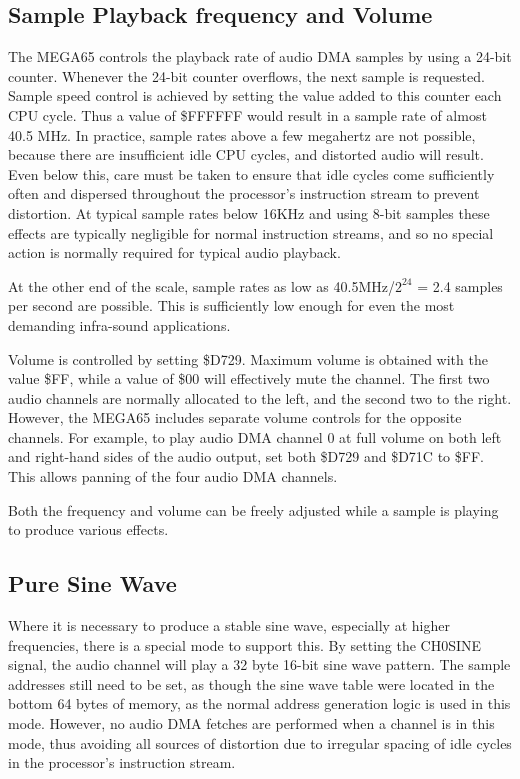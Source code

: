 \subsection{Sample Playback frequency and Volume}

The MEGA65 controls the playback rate of audio DMA samples by using a
24-bit counter.  Whenever the 24-bit counter overflows, the next
sample is requested. Sample speed control is achieved by setting the
value added to this counter each CPU cycle.  Thus a value of
\$FFFFFF would result in a sample rate of almost 40.5 MHz.  In
practice, sample rates above a few megahertz are not possible, because
there are insufficient idle CPU cycles, and distorted audio will
result.  Even below this, care must be taken to ensure that idle
cycles come sufficiently often and dispersed throughout the
processor's instruction stream to prevent distortion.  At typical
sample rates below 16KHz and using 8-bit samples these effects are
typically negligible for normal instruction streams, and so no special
action is normally required for typical audio playback.

At the other end of the scale, sample rates as low as 40.5MHz/$2^{24}$
= 2.4 samples per second are possible.  This is sufficiently low
enough for even the most demanding infra-sound applications.

Volume is controlled by setting \$D729.  Maximum volume is obtained
with the value \$FF, while a value of \$00 will effectively mute the
channel.  The first two audio channels are normally allocated to the
left, and the second two to the right.  However, the MEGA65 includes
separate volume controls for the opposite channels. For example, to
play audio DMA channel 0 at full volume on both left and right-hand sides
of the audio output, set both \$D729 and \$D71C to \$FF.  This allows
panning of the four audio DMA channels.

Both the frequency and volume can be freely adjusted while a sample is playing
to produce various effects.

\subsection{Pure Sine Wave}

Where it is necessary to produce a stable sine wave, especially at
higher frequencies,
there is a special mode to support this. By setting the CH0SINE
signal, the audio channel will play a 32 byte 16-bit sine wave
pattern.  The sample addresses still need to be set, as though the
sine wave table were located in the bottom 64 bytes of memory, as the
normal address generation logic is used in this mode. However, no
audio DMA fetches are performed when a channel is in this mode, thus
avoiding all sources of distortion due to irregular spacing of idle
cycles in the processor's instruction stream.

